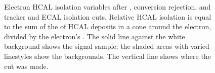  \begin{figure}[htb]
  \begin{center}
  \end{center}
  \caption[\fixspacing Electron HCAL isolation variables after \Et, conversion rejection, and tracker and ECAL isolation cuts]{
  \fixspacing Electron HCAL isolation variables after \Et, 
  conversion rejection, and tracker and ECAL isolation cuts.
  Relative HCAL isolation is equal to the sum of the \Et of HCAL deposits 
  in a cone around the electron, divided by the electron's \pt.
  The solid line against the white background shows the signal sample;
  the shaded areas with varied linestyles show the backgrounds.
  The vertical line shows where the cut was made.
  }
  \label{fig:hcalElecIsoVars}
 \end{figure}




